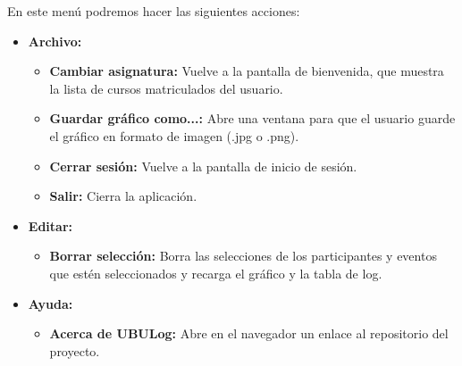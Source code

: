 
En este menú podremos hacer las siguientes acciones:

\begin{itemize}
	\tightlist
	\item
	\textbf{Archivo:}
	\begin{itemize}
		\tightlist
		\item
		\textbf{Cambiar asignatura:} Vuelve a la pantalla de bienvenida, que muestra la lista de cursos matriculados del usuario.
		\item
		\textbf{Guardar gráfico como...:} Abre una ventana para que el usuario guarde el gráfico en formato de imagen (.jpg o .png).
		\item
		\textbf{Cerrar sesión:} Vuelve a la pantalla de inicio de sesión.
		\item
		\textbf{Salir:} Cierra la aplicación.
	\end{itemize}
	\item
	\textbf{Editar:}
	\begin{itemize}
		\tightlist
		\item
		\textbf{Borrar selección:} Borra las selecciones de los participantes y eventos que estén seleccionados y recarga el gráfico y la tabla de log.
	\end{itemize}
	\item
	\textbf{Ayuda:}
	\begin{itemize}
		\tightlist
		\item
		\textbf{Acerca de UBULog:} Abre en el navegador un enlace al repositorio del proyecto.
	\end{itemize}
\end{itemize}











